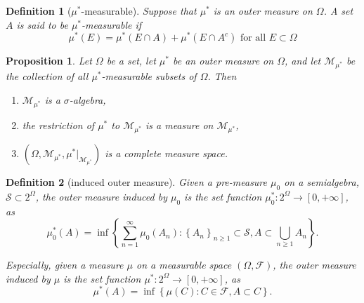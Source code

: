 \documentclass{report}
\newtheorem{definition}{Definition}[section]
\newtheorem{proposition}{Proposition}[section]
\theoremstyle{nonumberplain}
\begin{document}
\begin{definition}[$\mu^{*}$-measurable]
	Suppose that $\mu^*$ is an outer measure on $\Omega$. A set $A$ is said to be \emph{$\mu^{*}$-measurable} if
	\[
	\mu^{*}(E)=\mu^{*}(E \cap A)+\mu^{*}\left(E \cap A^{c}\right) \text { for all } E \subset \Omega
	\]
\end{definition}

\begin{proposition}
	Let $\Omega$ be a set, let $\mu^{*}$ be an outer measure on $\Omega$, and let $\mathcal{M}_{\mu^{*}}$ be the collection of all $\mu^{*}$-measurable subsets of $\Omega$. Then
	\begin{enumerate}[(1)]
		\item $\mathcal{M}_{\mu^{*}}$ is a $\sigma$-algebra,
		\item the restriction of $\mu^{*}$ to $\mathcal{M}_{\mu^{*}}$ is a measure on $\mathcal{M}_{\mu^{*}}$,
		\item $(\Omega, \mathcal{M}_{\mu^{*}}, \mu^{*}|_{\mathcal{M}_{\mu^{*}}})$ is a complete measure space.
	\end{enumerate}
\end{proposition}

\begin{definition}[induced outer measure]
	Given a pre-measure $\mu_0$ on a semialgebra, $\mathcal{S}\subset2^\Omega$, the \emph{outer measure induced by $\mu_0$} is the set function $\mu_0^*:2^\Omega\to[0,+\infty]$, as
	\[
	\mu^{*}_0(A) = \inf \left\{\sum_{n=1}^{\infty} \mu_0\left(A_{n}\right):\left\{A_{n}\right\}_{n \geq 1} \subset \mathcal{S}, A \subset \bigcup_{n \geq 1} A_{n}\right\}.
	\]

	Especially, given a measure $\mu$ on a measurable space $(\Omega,\mathcal{F})$, the \emph{outer measure induced by $\mu$} is the set function $\mu^*:2^\Omega\to[0,+\infty]$, as
	\[
	\mu^{*}(A) = \inf \left\{ \mu\left(C\right):C \in\mathcal{F}, A \subset C\right\}.
	\]
\end{definition}
\end{document}
